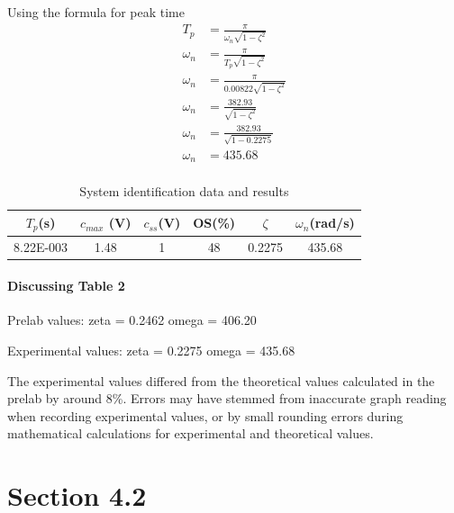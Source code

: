 \documentclass{article}
\begin{document}
Using the formula for peak time
\begin{align*}
    T_p &= \frac{\pi}{\omega_n\sqrt{1-\zeta^2}}\\
    \omega_n &= \frac{\pi}{T_p\sqrt{1-\zeta^2}}\\
    \omega_n &= \frac{\pi}{0.00822\sqrt{1-\zeta^2}}\\
    \omega_n &= \frac{382.93}{\sqrt{1-\zeta^2}}\\
    \omega_n &= \frac{382.93}{\sqrt{1-0.2275}}\\
    \omega_n &= 435.68\\
\end{align*}


\begin{table}[ht]
\centering
    \begin{tabular}{|c|c|c|c|c|c|}
        \hline
        $T_p$(s) & $c_{max}$ (V) & $c_{ss}$(V) & OS(\%) & $\zeta$ & $\omega_n$(rad/s)\\
        \hline
        8.22E-003 & 1.48 & 1 & 48 & 0.2275 & 435.68\\
        \hline
    \end{tabular}
    \caption{System identification data and results}
\end{table}

\paragraph{Discussing Table 2}

Prelab values: zeta = 0.2462 omega = 406.20

Experimental values: zeta = 0.2275 omega = 435.68

The experimental values differed from the theoretical values calculated in the prelab by around 8\%. Errors may have stemmed from inaccurate graph reading when recording experimental values, or by small rounding errors during mathematical calculations for experimental and theoretical values.


\section*{Section 4.2} %
\label{sec:section_4_2}
\end{document}
